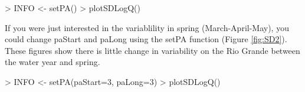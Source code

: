 \documentclass[a4paper,11pt]{article}
\begin{document}
\begin{Schunk}
\begin{Sinput}
> INFO <- setPA()
> plotSDLogQ()
\end{Sinput}
\end{Schunk}

If you were just interested in the variablility in spring (March-April-May), you could change paStart and paLong using the setPA function (Figure \ref{fig:SD2}). These figures show there is little change in variability on the Rio Grande between the water year and spring.  

\begin{Schunk}
\begin{Sinput}
> INFO <- setPA(paStart=3, paLong=3)
> plotSDLogQ()
\end{Sinput}
\end{Schunk}
\end{document}
